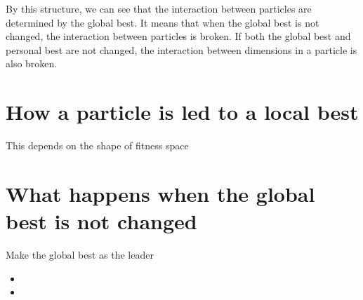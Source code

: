 \documentclass[10pt,a4paper]{article}
\begin{document}
By this structure, we can see that the interaction between particles are determined by the global best.
It means that when the global best is not changed, the interaction between particles is broken.
If both the global best and personal best are not changed, the interaction between dimensions in a particle is also broken.



\section{How a particle is led to a local best}

This depends on the shape of fitness space

\section{What happens when the global best is not changed}

Make the global best as the leader

\begin{itemize}
\item 
\item 
\end{itemize}
\end{document}
